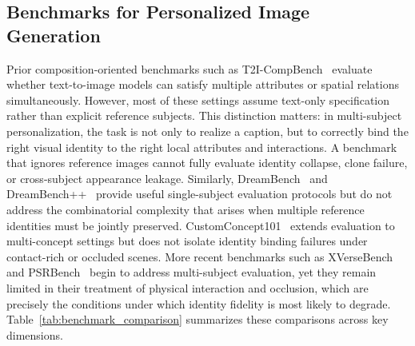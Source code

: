 \documentclass{article}
\begin{document}
\subsection{Benchmarks for Personalized Image Generation}
Prior composition-oriented benchmarks such as T2I-CompBench~\cite{huang2023t2i} evaluate whether text-to-image models can satisfy multiple attributes or spatial relations simultaneously.
However, most of these settings assume text-only specification rather than explicit reference subjects. This distinction matters: in multi-subject personalization, the task is not only to realize a caption, but to correctly bind the right visual identity to the right local attributes and interactions. A benchmark that ignores reference images cannot fully evaluate identity collapse, clone failure, or cross-subject appearance leakage. Similarly, DreamBench~\cite{ruiz2023dreambooth} and DreamBench++~\cite{peng2024dreambench} provide useful single-subject evaluation protocols but do not address the combinatorial complexity that arises when multiple reference identities must be jointly preserved. CustomConcept101~\cite{kumari2023multi} extends evaluation to multi-concept settings but does not isolate identity binding failures under contact-rich or occluded scenes. More recent benchmarks such as XVerseBench~\cite{chen2025xverse} and PSRBench~\cite{wang2025psr} begin to address multi-subject evaluation, yet they remain limited in their treatment of physical interaction and occlusion, which are precisely the conditions under which identity fidelity is most likely to degrade. Table~\ref{tab:benchmark_comparison} summarizes these comparisons across key dimensions.
\end{document}
